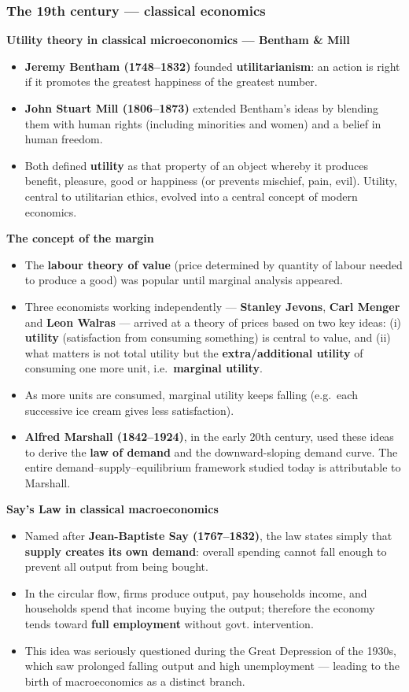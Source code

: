 \documentclass[a4paper,12pt]{article}
\begin{document}
\subsubsection*{The 19th century --- classical economics}
\textbf{Utility theory in classical microeconomics --- Bentham \& Mill}
\begin{itemize}
  \item \textbf{Jeremy Bentham (1748--1832)} founded \textbf{utilitarianism}: an action is right if it promotes the greatest happiness of the greatest number.
  \item \textbf{John Stuart Mill (1806--1873)} extended Bentham's ideas by blending them with human rights (including minorities and women) and a belief in human freedom.
  \item Both defined \textbf{utility} as that property of an object whereby it produces benefit, pleasure, good or happiness (or prevents mischief, pain, evil). Utility, central to utilitarian ethics, evolved into a central concept of modern economics.
\end{itemize}
\textbf{The concept of the margin}
\begin{itemize}
  \item The \textbf{labour theory of value} (price determined by quantity of labour needed to produce a good) was popular until marginal analysis appeared.
  \item Three economists working independently --- \textbf{Stanley Jevons}, \textbf{Carl Menger} and \textbf{Leon Walras} --- arrived at a theory of prices based on two key ideas: (i) \textbf{utility} (satisfaction from consuming something) is central to value, and (ii) what matters is not total utility but the \textbf{extra/additional utility} of consuming one more unit, i.e.\ \textbf{marginal utility}.
  \item As more units are consumed, marginal utility keeps falling (e.g.\ each successive ice cream gives less satisfaction).
  \item \textbf{Alfred Marshall (1842--1924)}, in the early 20th century, used these ideas to derive the \textbf{law of demand} and the downward-sloping demand curve. The entire demand--supply--equilibrium framework studied today is attributable to Marshall.
\end{itemize}
\textbf{Say's Law in classical macroeconomics}
\begin{itemize}
  \item Named after \textbf{Jean-Baptiste Say (1767--1832)}, the law states simply that \textbf{supply creates its own demand}: overall spending cannot fall enough to prevent all output from being bought.
  \item In the circular flow, firms produce output, pay households income, and households spend that income buying the output; therefore the economy tends toward \textbf{full employment} without govt. intervention.
  \item This idea was seriously questioned during the Great Depression of the 1930s, which saw prolonged falling output and high unemployment --- leading to the birth of macroeconomics as a distinct branch.
\end{itemize}
\end{document}
